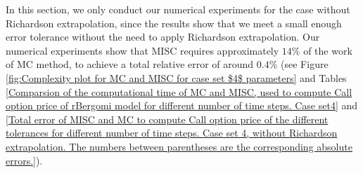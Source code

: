 In this section, we only conduct our numerical experiments for the case without Richardson extrapolation, since the results show that we meet a small enough error tolerance without the need to apply   Richardson extrapolation.  Our numerical experiments show that MISC requires  approximately $14\%$ of the work of MC method, to achieve a total relative error of around $0.4\%$ (see Figure \ref{fig:Complexity plot for MC and MISC for case set $4$ parameters} and Tables \ref{Comparsion of the computational time of  MC and MISC, used to compute Call option price of rBergomi model for different number of time steps. Case set4} and \ref{Total error of MISC and MC to compute Call option price of the different tolerances for different number of time steps. Case set 4, without Richardson extrapolation. The numbers between parentheses are the corresponding absolute errors.}). 

